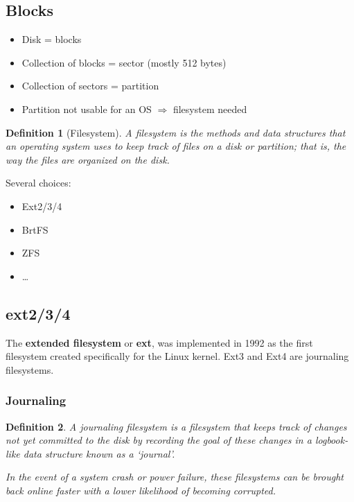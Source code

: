 \documentclass{article}
\newtheorem{theorem}{Definition}[section]
\begin{document}
\subsection{Blocks}

\begin{itemize}
    \item Disk = blocks
    \item Collection of blocks = sector (mostly 512 bytes)
    \item Collection of sectors = partition
    \item Partition not usable for an OS $\Rightarrow$ filesystem needed
\end{itemize}

\begin{theorem}[Filesystem]
    A filesystem is the methods and data structures that an operating system uses to keep track of files on a disk or partition; that is, the way the files are organized on the disk.
\end{theorem}

Several choices:

\begin{itemize}
    \item Ext2/3/4
    \item BrtFS
    \item ZFS
    \item \dots
\end{itemize}

\subsection{ext2/3/4}

The \textbf{extended filesystem} or \textbf{ext}, was implemented in 1992 as
the first filesystem created specifically for the Linux kernel. 
Ext3 and Ext4 are journaling filesystems.

\subsubsection{Journaling}

\begin{theorem}
    A journaling filesystem is a filesystem that keeps track of changes
    not yet committed to the disk by recording the goal of these changes
    in a logbook-like data structure known as a `journal'. 

    In the event of a system crash or power failure, these filesystems can be
    brought back online faster with a lower likelihood of becoming corrupted.
\end{theorem}
\end{document}
